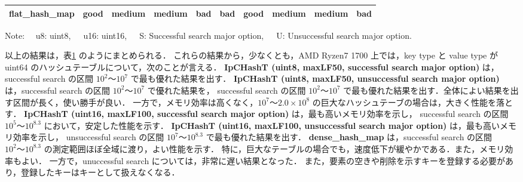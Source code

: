 \begin{table}
\begin{center}
\begin{tabular}{c|c|ccc|ccc|c|c}
        flat\_hash\_map        & \cellcolor{cGood}good   & \cellcolor{cMedi}medium & \cellcolor{cMedi}medium & \cellcolor{cBad }bad    & \cellcolor{cBad }bad    & \cellcolor{cGood}good   & \cellcolor{cMedi}medium  & \cellcolor{cMedi}medium & \cellcolor{cBad }bad  \rule[0pt]{0pt}{15pt} \\ \hline
    \end{tabular}
    Note: \ \ u8: uint8,\ \ \ u16: uint16,\ \ \ S: Successful search major option,\ \ \ U: Unsuccessful search major option.
    \label{table_hashT_cmp}
  \end{center}
\end{table}

以上の結果は，表\ref{table_hashT_cmp} のようにまとめられる．
これらの結果から，少なくとも，AMD Ryzen7 1700 上では，key type と value type が uint64 のハッシュテーブルについて，次のことが言える．
{\bf IpCHashT (uint8, maxLF50, successful search major option)} は，successful search の区間 $10^2〜10^7$ で最も優れた結果を出す．
{\bf IpCHashT (uint8, maxLF50, unsuccessful search major option)} は，successful search の区間 $10^2〜10^7$ で優れた結果を，
successful search の区間 $10^2〜10^7$ で最も優れた結果を出す．全体によい結果を出す区間が長く，使い勝手が良い．
一方で，メモリ効率は高くなく，$10^7〜2.0\times10^8$ の巨大なハッシュテーブの場合は，大きく性能を落とす．
{\bf IpCHashT (uint16, maxLF100, successful search major option)} は，最も高いメモリ効率を示し，
successful search の区間 $10^5〜10^{8.3}$ において，安定した性能を示す．
{\bf IpCHashT (uint16, maxLF100, unsuccessful search major option)} は，最も高いメモリ効率を示し，
unsuccessful search の区間 $10^7〜10^{8.3}$ で最も優れた結果を出す．
{\bf dense\_hash\_map} は，successful search の区間 $10^2〜10^{8.3}$ の測定範囲ほぼ全域に渡り，よい性能を示す．
特に，巨大なテーブルの場合でも，速度低下が緩やかである．また，メモリ効率もよい．
一方で，unuccessful search については，非常に遅い結果となった．
また，要素の空きや削除を示すキーを登録する必要があり，登録したキーはキーとして扱えなくなる．






